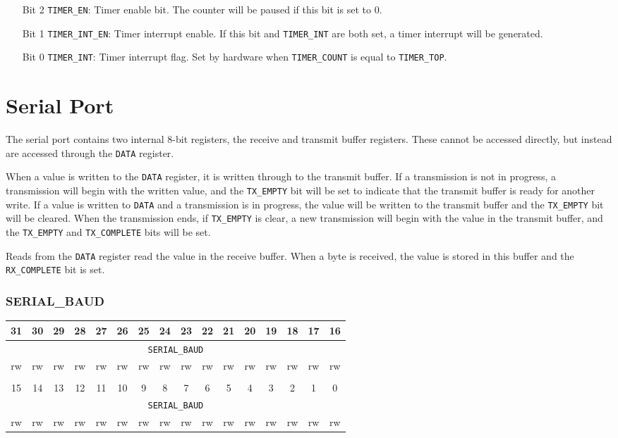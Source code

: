 \documentclass[11pt,openany]{report}
\begin{document}
\begin{enumerate}
  \item[Bit 2] \verb|TIMER_EN|: Timer enable bit. The counter will be paused if
    this bit is set to 0.
  \item[Bit 1] \verb|TIMER_INT_EN|: Timer interrupt enable. If this bit and
    \verb|TIMER_INT| are both set, a timer interrupt will be generated.
  \item[Bit 0] \verb|TIMER_INT|: Timer interrupt flag. Set by hardware
    when \verb|TIMER_COUNT| is equal to \verb|TIMER_TOP|.
\end{enumerate}

\section{Serial Port}

The serial port contains two internal 8-bit registers, the receive and
transmit buffer registers. These cannot be accessed directly, but instead
are accessed through the \verb|DATA| register.

When a value is written to the \verb|DATA| register, it is written
through to the transmit buffer. If a transmission is not in progress,
a transmission will begin with the written value, and the \verb|TX_EMPTY|
bit will be set to indicate that the transmit buffer is ready for
another write. If a value is written to \verb|DATA| and a transmission
is in progress, the value will be written to the transmit buffer and
the \verb|TX_EMPTY| bit will be cleared. When the transmission
ends, if \verb|TX_EMPTY| is clear, a new transmission will begin
with the value in the transmit buffer, and the \verb|TX_EMPTY|
and \verb|TX_COMPLETE| bits will be set.

Reads from the \verb|DATA| register read the value in the receive buffer.
When a byte is received, the value is stored in this buffer and the
\verb|RX_COMPLETE| bit is set.

\subsubsection{SERIAL\_BAUD}

\begin{center}
  \begin{tabular}{|c|c|c|c|c|c|c|c|c|c|c|c|c|c|c|c|}
    \hline
    31 & 30 & 29 & 28 & 27 & 26 & 25 & 24 & 23 & 22 & 21 & 20 & 19 & 18 & 17 & 16 \\
    \hline
    \multicolumn{16}{|c|}{\texttt{SERIAL\_BAUD}}\\
    \hline
    rw & rw & rw & rw & rw & rw & rw & rw & rw & rw & rw & rw & rw & rw & rw & rw\\
    \hline
    \multicolumn{16}{c}{}\\
    \hline
    15 & 14 & 13 & 12 & 11 & 10 & 9 & 8 & 7 & 6 & 5 & 4 & 3 & 2 & 1 & 0 \\
    \hline
    \multicolumn{16}{|c|}{\texttt{SERIAL\_BAUD}}\\
    \hline
    rw & rw & rw & rw & rw & rw & rw & rw & rw & rw & rw & rw & rw & rw & rw & rw\\
    \hline
  \end{tabular}
\end{center}
\end{document}
